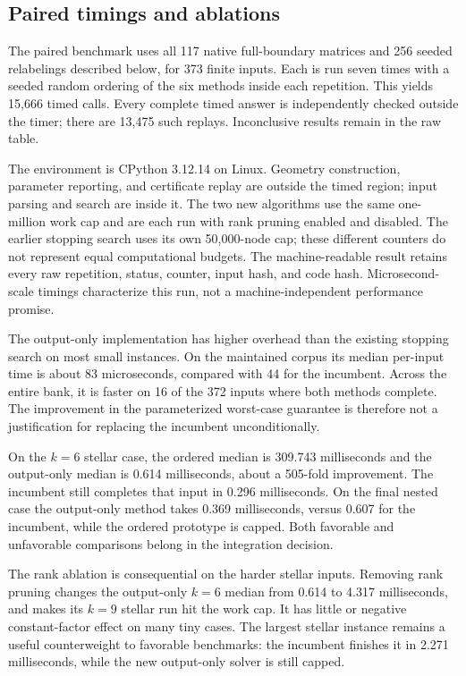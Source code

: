 \subsection{Paired timings and ablations}

The paired benchmark uses all 117 native full-boundary matrices and 256
seeded relabelings described below, for 373 finite inputs. Each is run
seven times with a seeded random ordering of the six methods inside each
repetition. This yields 15,666 timed calls. Every complete timed answer
is independently checked outside the timer; there are 13,475 such
replays. Inconclusive results remain in the raw table.

The environment is CPython 3.12.14 on Linux. Geometry construction,
parameter reporting, and certificate replay are outside the timed region;
input parsing and search are inside it. The two new algorithms use the
same one-million work cap and are each run with rank pruning enabled and
disabled. The earlier stopping search uses its own 50,000-node cap;
these different counters do not represent equal computational budgets.
The machine-readable result retains every raw repetition, status, counter,
input hash, and code hash. Microsecond-scale timings characterize this run,
not a machine-independent performance promise.



The output-only implementation has higher overhead than the existing
stopping search on most small instances. On the maintained corpus its
median per-input time is about 83 microseconds, compared with 44 for the
incumbent. Across the entire bank, it is faster on 16 of the 372 inputs
where both methods complete. The improvement in the parameterized
worst-case guarantee is therefore not a justification for replacing the
incumbent unconditionally.



On the $k=6$ stellar case, the ordered median is 309.743 milliseconds
and the output-only median is 0.614 milliseconds, about a 505-fold
improvement. The incumbent still completes that input in 0.296
milliseconds. On the final nested case the output-only method takes
0.369 milliseconds, versus 0.607 for the incumbent, while the ordered
prototype is capped. Both favorable and unfavorable comparisons belong
in the integration decision.

The rank ablation is consequential on the harder stellar inputs. Removing
rank pruning changes the output-only $k=6$ median from 0.614 to 4.317
milliseconds, and makes its $k=9$ stellar run hit the work cap. It has
little or negative constant-factor effect on many tiny cases. The
largest stellar instance remains a useful counterweight to favorable
benchmarks: the incumbent finishes it in 2.271 milliseconds, while the
new output-only solver is still capped.

